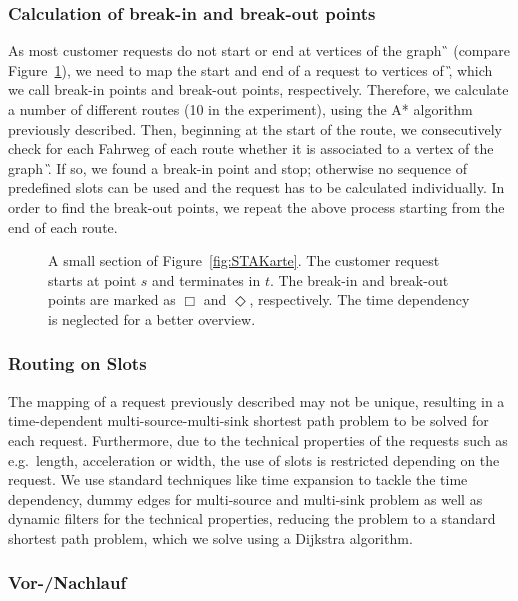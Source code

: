 \subsubsection{Calculation of break-in and break-out points}
%
As most customer requests do not start or end at vertices of the graph \G\, (compare Figure~\ref{fig:E-A-Pkte}), we need to map the start and end of a request to vertices of \G, which we call break-in points and break-out points, respectively. Therefore, we calculate a number of different routes (10 in the experiment), using the A* algorithm previously described. Then, beginning at the start of the route, we consecutively check for each Fahrweg of each route whether it is associated to a vertex of the graph \G. If so, we found a break-in point and stop; otherwise no sequence of predefined slots can be used and the request has to be calculated individually. In order to find the break-out points, we repeat the above process starting from the end of each route.
%
\begin{figure}[tb]
	\centering
	\caption{A small section of Figure~\ref{fig:STAKarte}. The customer request starts at point $s$ and terminates in $t$. The break-in and break-out points are marked as $\Box$ and $\Diamond$, respectively. The time dependency is neglected for a better overview.}
	\label{fig:E-A-Pkte}
\end{figure}

\subsubsection{Routing on Slots}
The mapping of a request previously described may not be unique, resulting in a time-dependent multi-source-multi-sink shortest path problem to be solved for each request. Furthermore, due to the technical properties of the requests such as e.g.\ length, acceleration or width, the use of slots is restricted depending on the request.
We use standard techniques like time expansion to tackle the time dependency, dummy edges for multi-source and multi-sink problem as well as dynamic filters for the technical properties, reducing the problem to a standard shortest path problem, which we solve using a Dijkstra algorithm.

\subsubsection{Vor-/Nachlauf}

